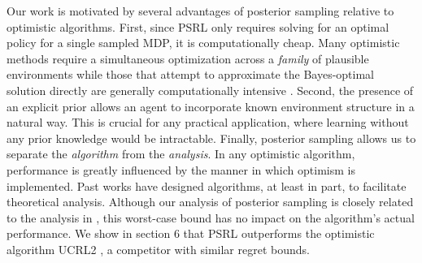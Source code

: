 Our work is motivated by several advantages of posterior sampling relative to optimistic algorithms. First, since PSRL only requires solving for an optimal policy for a single sampled MDP, it is computationally cheap. Many optimistic methods require a simultaneous optimization across a \emph{family} of plausible environments \cite{jaksch2010near,bartlett2009regal,wang2005bayesian} while those that attempt to approximate the Bayes-optimal solution directly are generally computationally intensive \cite{wang2005bayesian,guez2012efficient, asmuth2011approaching}. Second, the presence of an explicit prior allows an agent to incorporate known environment structure in a natural way. This is crucial for any practical application, where learning without any prior knowledge would be intractable. Finally, posterior sampling allows us to separate the \emph{algorithm} from the \emph{analysis}. In any optimistic algorithm, performance is greatly influenced by the manner in which optimism is implemented. Past works have designed algorithms, at least in part, to facilitate theoretical analysis. Although our analysis of posterior sampling is closely related to the analysis in \cite{jaksch2010near}, this worst-case bound has no impact on the algorithm's actual performance. We show in section 6 that PSRL outperforms the optimistic algorithm UCRL2 \cite{jaksch2010near}, a competitor with similar regret bounds.
